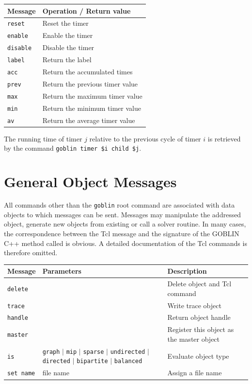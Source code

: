 \documentclass[a4paper,11pt,twoside]{book}
\begin{document}
\bigskip
\begin{center}
\begin{tabular}{|p{4.3cm}|p{11cm}|}
\hline
{\bf Message}   & {\bf Operation / Return value} \\
\hline
\hline
\verb/reset/    & Reset the timer \\
\hline
\verb/enable/   & Enable the timer \\
\hline
\verb/disable/  & Disable the timer \\
\hline
\verb/label/    & Return the label \\
\hline
\verb/acc/      & Return the accumulated times \\
\hline
\verb/prev/     & Return the previous timer value \\
\hline
\verb/max/      & Return the maximum timer value \\
\hline
\verb/min/      & Return the minimum timer value \\
\hline
\verb/av/       & Return the average timer value \\
\hline
\end{tabular}
\end{center}

\bigskip
\noindent
The running time of timer $j$ relative to the previous cycle of timer $i$ is
retrieved by the command \verb/goblin timer $i child $j/.


\section{General Object Messages}
All commands other than the \verb/goblin/ root command are associated with
data objects to which messages can be sent. Messages may manipulate the
addressed object, generate new objects from existing or call a solver routine.
In many cases, the correspondence between the Tcl message and the signature of
the GOBLIN C++ method called is obvious. A detailed documentation of the Tcl
commands is therefore omitted.

\begin{center}
\begin{tabular}{|p{2cm}|p{14.5cm}|p{8cm}|}
\hline
{\bf Message}       & {\bf Parameters} & {\bf Description} \\
\hline
\hline
\verb/delete/       & & Delete object and Tcl command \\
\hline
\verb/trace/        & & Write trace object \\
\hline
\verb/handle/       & & Return object handle \\
\hline
\verb/master/       & & Register this object as the master object \\
\hline
\verb/is/           & \verb/graph/ $|$ \verb/mip/ $|$ \verb/sparse/ $|$ 
                      \verb/undirected/ $|$ \verb/directed/ $|$ 
                      \verb/bipartite/ $|$ \verb/balanced/
                    & Evaluate object type  \\
\hline
\verb/set name/     & file name & Assign a file name \\
\hline
\end{tabular}
\end{center}
\end{document}
